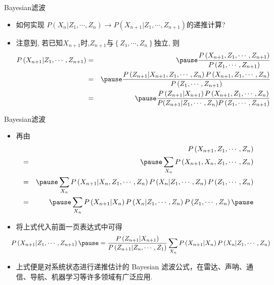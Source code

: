 \begin{frame}{{\rm Bayesian}滤波}
\begin{itemize}[<+-|alert@+>]
	\item 如何实现 $P\left(X_{n} | Z_{1}, \cdots, Z_{n}\right) \longrightarrow P\left(X_{n+1} | Z_{1}, \cdots, Z_{n+1}\right)$的递推计算?
	\item 注意到, 若已知$X_{n+1}$时,$Z_{n+1}$与$\left\{Z_{1}, \cdots, Z_{n}\right\}$独立, 则
	{\small\begin{eqnarray*}
		P\left(X_{n+1} | Z_{1}, \cdots, Z_{n+1}\right)&=&  \pause\frac{P\left(X_{n+1}, Z_{1}, \cdots, Z_{n+1}\right)}{P\left(Z_{1}, \cdots, Z_{n+1}\right)}\\
		&=& \pause\frac{P\left(Z_{n+1} | X_{n+1}, Z_{1}, \cdots, Z_{n}\right) P\left(X_{n+1}, Z_{1}, \cdots, Z_{n}\right)}{P\left(Z_{1}, \cdots, Z_{n+1}\right)}\\
		&=&\pause \frac{P\left(Z_{n+1} | X_{n+1}\right) P\left(X_{n+1}, Z_{1}, \cdots, Z_{n}\right)}{P(Z_{n+1}|Z_{1}, \cdots, Z_n)P\left(Z_{1}, \cdots, Z_{n+1}\right)}
	\end{eqnarray*}}




\end{itemize}



\end{frame}

\begin{frame}{{\rm Bayesian}滤波}
	\begin{itemize}[<+-|alert@+>]
		\item 再由\pause
		{\small \begin{eqnarray*}
			&&P\left(X_{n+1}, Z_{1}, \cdots, Z_{n}\right)\\
			&=&\pause\sum_{X_{n}} P\left(X_{n+1}, X_{n}, Z_{1}, \cdots, Z_{n}\right) \\
			&=&\pause\sum_{X_{n}} P\left(X_{n+1} | X_{n}, Z_{1}, \cdots, Z_{n}\right) P\left(X_{n} | Z_{1}, \cdots, Z_{n}\right) P\left(Z_{1}, \cdots, Z_{n}\right) \\
			&=&\pause\sum_{X_{n}} P\left(X_{n+1} | X_{n}\right) P\left(X_{n} | Z_{1}, \cdots, Z_{n}\right) P\left(Z_{1}, \cdots, Z_{n}\right)\pause
		\end{eqnarray*}}
	    \item 将上式代入前面一页表达式中可得
	{\small \[
		\hspace{-0.3cm} P\left(X_{n+1} | Z_{1}, \cdots, Z_{n+1}\right)\pause=\frac{P\left(Z_{n+1} | X_{n+1}\right)}{P\left(Z_{n+1} | Z_{n}, \cdots, Z_{1}\right)} \sum_{X_{n}} P\left(X_{n+1} | X_{n}\right) P\left(X_{n} | Z_{1}, \cdots, Z_{n}\right)\]}
		\item 上式便是对系统状态进行递推估计的 Bayesian 滤波公式，在雷达、声呐、通信、导航、机器学习等许多领域有广泛应用.

	\end{itemize}






	\end{frame}
